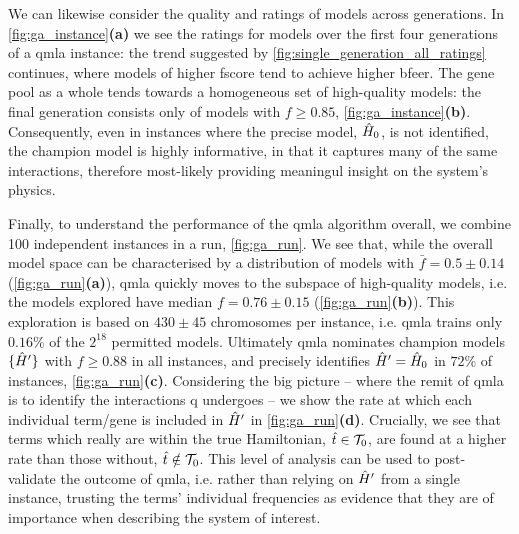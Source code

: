 {We can likewise consider the quality and ratings of models across generations.
In \cref{fig:ga_instance}\textbf{(a)} we see the ratings for models over the first 
    four generations of a \gls{qmla} \gls{instance}:
    the trend suggested by \cref{fig:single_generation_all_ratings} continues,
    where models of higher \gls{fscore} tend to achieve higher \gls{bfeer}.
The gene pool as a whole tends towards a homogeneous set of high-quality models:
    the final generation consists only of models with $f \geq 0.85$, \cref{fig:ga_instance}\textbf{(b)}. 
Consequently, even in \glspl{instance} where the precise model, $\hat{H}_0$, is not identified, the \gls{champion model}
    is highly informative, in that it captures many of the same interactions, 
    therefore most-likely providing meaningul insight on the system's physics. 

\par 

Finally, to understand the performance of the \gls{qmla} algorithm overall, 
    we combine 100 independent \glspl{instance} in a \gls{run}, \cref{fig:ga_run}. 
We see that, while the overall \gls{model space} can be characterised by a distribution 
    of models with $\bar{f} = 0.5 \pm 0.14$ (\cref{fig:ga_run}\textbf{(a)}), 
    \gls{qmla} quickly moves to the subspace of high-quality models, 
    i.e. the models explored have median $f = 0.76 \pm 0.15$ (\cref{fig:ga_run}\textbf{(b)}).
This exploration is based on $430 \pm 45$ chromosomes per instance, 
    i.e. \gls{qmla} trains only $0.16\%$ of the $2^{18}$ permitted models. 
Ultimately \gls{qmla} nominates \glspl{champion model} $\{ \hat{H}^{\prime} \}$ with $f \geq 0.88$ in all instances, 
    and precisely identifies $\hat{H}^{\prime}=\hat{H}_0$ in $72\%$ of instances, \cref{fig:ga_run}\textbf{(c)}. 
Considering the big picture 
    -- where the remit of \gls{qmla} is to identify the interactions \gls{q} undergoes -- 
    we show the rate at which each individual term/gene is included in $\hat{H}^{\prime}$ in 
    \cref{fig:ga_run}\textbf{(d)}. 
Crucially, we see that terms which really are within the true Hamiltonian, $\hat{t} \in \mathcal{T}_0$, 
    are found at a higher rate than those without, $\hat{t} \notin \mathcal{T}_0$. 
This level of analysis can be used to post-validate the outcome of \gls{qmla}, 
    i.e. rather than relying on $\hat{H}^{\prime}$ from a single instance, 
    trusting the terms' individual frequencies as evidence that they are of importance when describing 
    the system of interest. 
\par 

}
